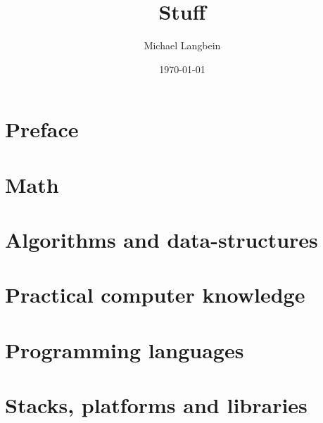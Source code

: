 \documentclass{book}
\title{Stuff}
\author{Michael Langbein}
\date{\today}
\begin{document}
\maketitle
\tableofcontents


\chapter*{Preface}



\chapter{Math}









%




%






\chapter{Algorithms and data-structures}



\chapter{Practical computer knowledge}






\chapter{Programming languages}




%






\chapter{Stacks, platforms and libraries}








\end{document}
